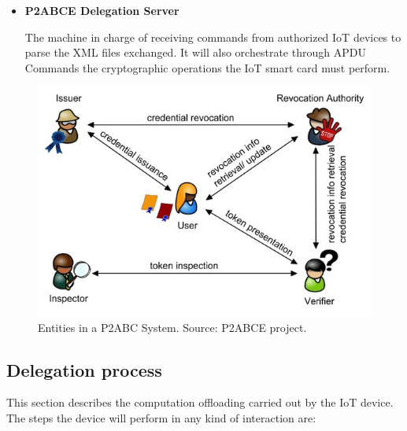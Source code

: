 \begin{itemize}
	Figure \ref{fig:actors} showcases the different actors and their interactions, where the User is in the center, which receives a credential from an Issuer, can generate privacy-preserving Tokens for Verifiers or revoke an stolen credential. The Inspector is the only entity capable of reading some ciphered attributes from a Token, if the User accepted to include that ciphered information in it. It serves the Law Enforcement authorities, warrant granted, to track any misuse of a credential.
	
	
	\item \textbf{P2ABCE Delegation Server}
	
	The machine in charge of receiving commands from authorized IoT devices to parse the XML files exchanged. It will also orchestrate through APDU Commands the cryptographic operations the IoT smart card must perform.
	
	
\end{itemize}

\begin{figure}[bth]
	\centering
	\includegraphics[width=0.8\linewidth]{gfx/actors.jpg}
	\caption{Entities in a P2ABC System. Source: P2ABCE project.}
	\label{fig:actors}
\end{figure}


\subsection{Delegation process}

This section describes the computation offloading carried out by the IoT device. The steps the device will perform in any kind of interaction are:

